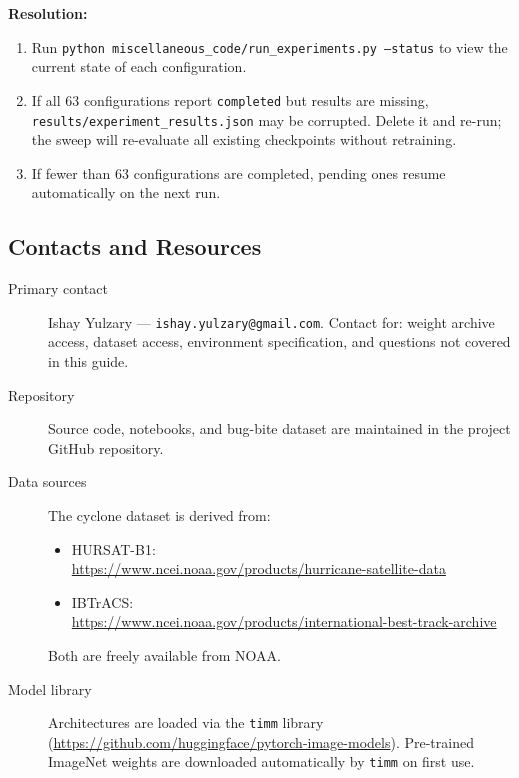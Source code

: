\documentclass[12pt,a4paper]{article}
\begin{document}
\textbf{Resolution:}
\begin{enumerate}
    \item Run \texttt{python miscellaneous\_code/run\_experiments.py
          --status} to view the current state of each configuration.
    \item If all 63 configurations report \texttt{completed} but results
          are missing, \\\texttt{results/experiment\_results.json} may be
          corrupted. Delete it and re-run; the sweep will re-evaluate all
          existing checkpoints without retraining.
    \item If fewer than 63 configurations are completed, pending ones
          resume automatically on the next run.
\end{enumerate}

\subsection{Contacts and Resources}
\label{sec:mg-contacts}

\begin{description}
    \item[Primary contact] Ishay Yulzary ---
          \texttt{ishay.yulzary@gmail.com}.
          Contact for: weight archive access, dataset access, environment
          specification, and questions not covered in this guide.

    \item[Repository] Source code, notebooks, and bug-bite dataset are
          maintained in the project GitHub repository.

    \item[Data sources] The cyclone dataset is derived from:
          \begin{itemize}
              \item HURSAT-B1:
                    \\\url{https://www.ncei.noaa.gov/products/hurricane-satellite-data}
              \item IBTrACS:
                    \\\url{https://www.ncei.noaa.gov/products/international-best-track-archive}
          \end{itemize}
          Both are freely available from NOAA.

    \item[Model library] Architectures are loaded via the \texttt{timm}
          library (\url{https://github.com/huggingface/pytorch-image-models}).
          Pre-trained ImageNet weights are downloaded automatically by
          \texttt{timm} on first use.
\end{description}

\end{document}
